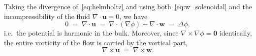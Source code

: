 \documentclass{article}
\newcommand{\uu}{\mathbf{u}}
\newcommand{\ww}{\mathbf{w}}
\begin{document}

Taking the divergence of~\eqref{eq:helmholtz} and using both~\eqref{eq:w_solenoidal} and the incompressibility of the fluid $\nabla \cdot \uu = 0$, we have
\begin{equation}
    0 \;=\; \nabla \cdot \uu \;=\; \nabla \cdot (\nabla\phi) + \nabla \cdot \ww \;=\; \Delta\phi, \label{eq:laplace_derivation}
\end{equation}
i.e.\ the potential is harmonic in the bulk.
Moreover, since $\nabla \times \nabla\phi = \bm{0}$ identically, the entire vorticity of the flow is carried by the vortical part,
\begin{equation}
    \nabla \times \uu \;=\; \nabla \times \ww. \label{eq:vorticity_in_w}
\end{equation}
\end{document}
